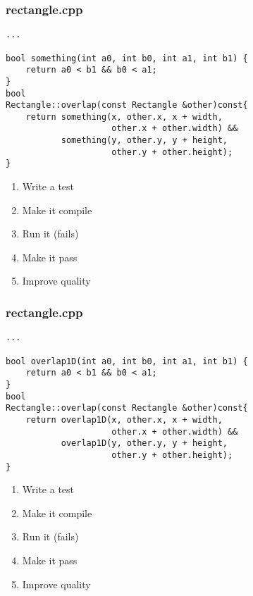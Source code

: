 \begin{frame}[fragile]
\frametitle{rectangle.cpp}
\begin{minipage}[t]{0.48\linewidth}
\begin{lstlisting}
...

bool something(int a0, int b0, int a1, int b1) {
    return a0 < b1 && b0 < a1;
}
bool 
Rectangle::overlap(const Rectangle &other)const{
    return something(x, other.x, x + width, 
                     other.x + other.width) &&
           something(y, other.y, y + height,
                     other.y + other.height);
}
\end{lstlisting}
\end{minipage}\hfill
\begin{minipage}[t]{0.28\linewidth}
  \small
  \begin{enumerate} 
    \item \textcolor{deadcolor}{Write a test}
    \item \textcolor{deadcolor}{Make it compile}
    \item \textcolor{deadcolor}{Run it (fails)}
    \item \textcolor{deadcolor}{Make it pass}
    \item \textcolor{activecolor}{Improve quality}
  \end{enumerate} 
\end{minipage}
\end{frame}

\begin{frame}[fragile]
\frametitle{rectangle.cpp}
\begin{minipage}[t]{0.48\linewidth}
\begin{lstlisting}
...

bool overlap1D(int a0, int b0, int a1, int b1) {
    return a0 < b1 && b0 < a1;
}
bool 
Rectangle::overlap(const Rectangle &other)const{
    return overlap1D(x, other.x, x + width, 
                     other.x + other.width) &&
           overlap1D(y, other.y, y + height,
                     other.y + other.height);
}
\end{lstlisting}
\end{minipage}\hfill
\begin{minipage}[t]{0.28\linewidth}
  \small
  \begin{enumerate} 
    \item \textcolor{deadcolor}{Write a test}
    \item \textcolor{deadcolor}{Make it compile}
    \item \textcolor{deadcolor}{Run it (fails)}
    \item \textcolor{deadcolor}{Make it pass}
    \item \textcolor{activecolor}{Improve quality}
  \end{enumerate} 
\end{minipage}
\end{frame}

